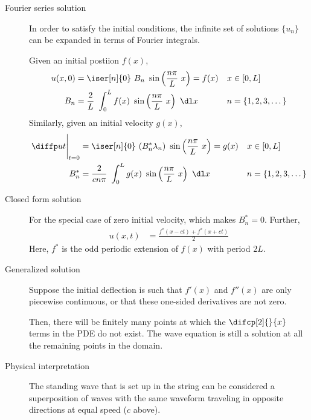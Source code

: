 \begin{description}
    \item[Fourier series solution] In order to satisfy the initial conditions, the
        infinite set of solutions $ \{u_n\} $ can be expanded in terms of Fourier
        integrals. \par
        Given an initial postiion $ f(x) $,
        \begin{align}
            u(x, 0)        & = \iser[n]{0}\ B_n\ \sin\left( \frac{n\pi}{L}\ x
            \right) = f(x) &
            x              & \in [0, L]                                       \\
            B_n            & = \frac{2}{L}\ \int_{0}^{L} f(x)\
            \sin\left( \frac{n\pi}{L}\ x
            \right)\ \dl x &
            n              & = \{1,2,3,\dots\}
        \end{align}
        Similarly, given an initial velocity $ g(x) $,
        \begin{align}
            \diffp ut\Bigg|_{t=0} & = \iser[n]{0}\ (B_n^* \lambda_n)
            \ \sin\left( \frac{n\pi}{L}\ x
            \right) = g(x)        &
            x                     & \in [0, L]                            \\
            B_n^*                 & = \frac{2}{cn\pi}\ \int_{0}^{L} g(x)\
            \sin\left( \frac{n\pi}{L}\ x
            \right)\ \dl x        &
            n                     & = \{1,2,3,\dots\}
        \end{align}

    \item[Closed form solution] For the special case of zero initial velocity, which
        makes $ B_n^* = 0 $. Further,
        \begin{align}
            u(x, t) & = \frac{f^*(x - ct) + f^*(x + ct)}{2}
        \end{align}
        Here, $ f^* $ is the odd periodic extension of $ f(x) $ with period $ 2L $.

    \item[Generalized solution] Suppose the initial deflection is such that $ f'(x) $ and
        $ f''(x) $ are only piecewise continuous, or that these one-sided derivatives are
        not zero. \par
        Then, there will be finitely many points at which the $ \difcp[2]{}{x} $ terms in
        the PDE do not exist. The wave equation is still a solution at all the remaining
        points in the domain.

    \item[Physical interpretation] The standing wave that is set up in the string can
        be considered a superposition of waves with the same waveform traveling in
        opposite directions at equal speed ($ c $ above).
\end{description}

